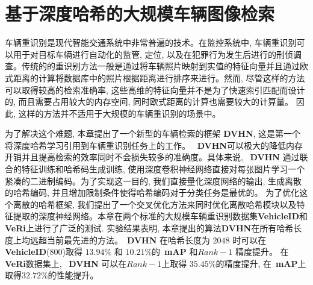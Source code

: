 \chapter{基于深度哈希的大规模车辆图像检索}
车辆重识别是现代智能交通系统中非常普遍的技术。在监控系统中, 车辆重识别可以用于对目标车辆进行自动化的监管, 定位, 以及在犯罪行为发生后进行的刑侦调查。传统的的重识别方法一般是通过将车辆照片映射到实值的特征向量并且通过欧式距离的计算将数据库中的照片根据距离进行排序来进行。然而, 尽管这样的方法可以取得较高的检索准确率, 这些高维的特征向量并不是为了快速索引匹配而设计的, 而且需要占用较大的内存空间, 同时欧式距离的计算也需要较大的计算量。 因此, 这样的方法并不适用于大规模的车辆重识别的场景中。 \par
为了解决这个难题, 本章提出了一个新型的车辆检索的框架 \textbf{DVHN}, 这是第一个将深度哈希学习引用到车辆重识别任务上的工作。 ~\textbf{DVHN}可以极大的降低内存开销并且提高检索的效率同时不会损失较多的准确度。具体来说, ~\textbf{DVHN} 通过联合的特征训练和哈希码生成训练, 使用深度卷积神经网络直接对每张图片学习一个紧凑的二进制编码。为了实现这一目的, 我们直接量化深度网络的输出, 生成离散的哈希编码, 并且增加限制条件使得哈希编码对于分类任务是最优的。 为了优化这个离散的哈希框架, 我们提出了一个交叉优化方法来同时优化离散哈希模块以及特征提取的深度神经网络。本章在两个标准的大规模车辆重识别数据集\textbf{VehicleID}和\textbf{VeRi}上进行了广泛的测试. 实验结果表明, 本章提出的算法\textbf{DVHN}在所有哈希长度上均远超当前最先进的方法。~\textbf{DVHN} 在哈希长度为 $2048$ 时可以在\textbf{VehicleID}(800)取得 $13.94 \%$ 和 $10.21 \%$的~\textbf{mAP} 和$Rank-1$ 精度提升。 在 \textbf{VeRi}数据集上, ~\textbf{DVHN} 可以在$Rank-1$上取得 $35.45 \%$的精度提升, 在~\textbf{mAP}上取得$32.72 \%$的性能提升。
